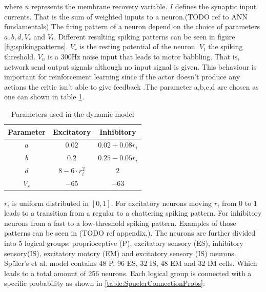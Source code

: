 where $u$ represents the membrane recovery variable. $I$ defines the synaptic input currents. That is the sum of weighted inputs to a neuron.(TODO ref to ANN fundamentals) The firing pattern of a neuron depend on the choice of parameters $a,b,d,V_r$ and $V_t$. Different resulting spiking patterns can be seen in figure \ref{fig:spikingpatterns}. $V_r$ is the resting potential of the neuron. $V_t$ the spiking threshold. $V_n$ is a 300Hz noise input that leads to motor babbling. That is, network send output signals although no input signal is given. This behaviour is important for reinforcement learning since if the actor doesn't produce any actions the critic isn't able to give feedback \cite{chadderdonNeuronalModel}.The parameter a,b,c,d are chosen as one can shown in table \ref{table:DynamiModelParams}.
\begin{table}[h]
	\centering
	\begin{tabular}{ |c||c|c|  }		
		\hline
		Parameter & Excitatory & Inhibitory \\
 		\hline
 		$a$&$0.02$& $0.02+0.08r_i$\\
 		$b$&$0.2$& $0.25-0.05r_i$\\
 		$d$&$8-6\cdot r_i^2$& $2$\\
 		$V_r$&$-65$& $-63$\\
 		\hline
	\end{tabular}
	\caption[Dynamic model's parameters ]{Parameters used in the dynamic model }
	\label{table:DynamiModelParams}
\end{table}


$r_i$ is uniform distributed in  $[0,1]$. For excitatory neurons moving $r_i$ from $0$ to $1$ leads to a transition from a regular to a chattering spiking pattern. For inhibitory neurons from a fast to a low-threshold spiking pattern. Examples of those patterns can be seen in (TODO ref appendix.).
The neurons are further divided into 5 logical groups: proprioceptive (P), excitatory sensory (ES), inhibitory sensory(IS), excitatory motory (EM) and excitatory sensory (IS) neurons.  Spüler's et al. model contains 48 P, 96 ES, 32 IS, 48 EM and 32 IM cells. Which leads to a total amount of 256 neurons.
Each logical group is connected with a specific probability as shown in \ref{table:SpuelerConnectionProbs}:

